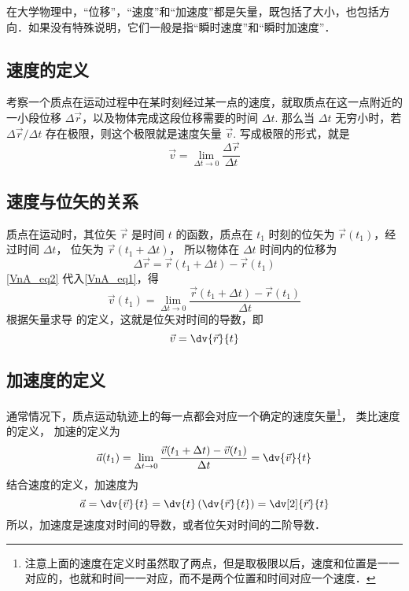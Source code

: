 

在大学物理中，“位移”，“速度”和“加速度”都是矢量，既包括了大小，也包括方向．如果没有特殊说明，它们一般是指“瞬时速度”和“瞬时加速度”．

\subsection{速度的定义}
考察一个质点在运动过程中在某时刻经过某一点的速度，就取质点在这一点附近的一小段位移 $\Delta\vec r$，以及物体完成这段位移需要的时间 $\Delta t$. 那么当 $\Delta t$ 无穷小时，若 $\Delta \vec r/\Delta t$ 存在极限，则这个极限就是速度矢量 $\vec v$. 写成极限的形式，就是
\begin{equation}\label{VnA_eq1}
\vec v = \lim_{\Delta t \to 0} \frac{{\Delta \vec r}}{{\Delta t}}
\end{equation}

\subsection{速度与位矢的关系}

质点在运动时，其位矢 $\vec r$ 是时间 $t$ 的函数，质点在 ${t_1}$ 时刻的位矢为 $\vec r(t_1)$，经过时间 $\Delta t$， 位矢为 $\vec r(t_1 + \Delta t)$， 所以物体在 $\Delta t$ 时间内的位移为
\begin{equation}\label{VnA_eq2}
\Delta \vec r = \vec r (t_1 + \Delta t) - \vec r (t_1)
\end{equation}
\autoref{VnA_eq2} 代入\autoref{VnA_eq1}，得
\begin{equation}\label{VnA_eq3}
\vec v(t_1) = \lim_{\Delta t \to 0} \frac{{\vec r (t_1 + \Delta t) - \vec r(t_1)}}{{\Delta t}}
\end{equation}
根据矢量求导 的定义，这就是位矢对时间的导数，即
\begin{equation}
\vec v = \dv{\vec r}{t}
\end{equation}


\subsection{加速度的定义}

通常情况下，质点运动轨迹上的每一点都会对应一个确定的速度矢量\footnote{注意上面的速度在定义时虽然取了两点，但是取极限以后，速度和位置是一一对应的，也就和时间一一对应，而不是两个位置和时间对应一个速度．}， 类比速度的定义， 加速的定义为
\begin{equation}
\vec a(t_1) = \lim_{\Delta t \to 0} \frac{{\vec v(t_1 + \Delta t) - \vec v (t_1)}}{{\Delta t}} = \dv{\vec v}{t}
\end{equation}
结合速度的定义，加速度为
\begin{equation}
\vec a = \dv{\vec v}{t} = \dv{t} \left( \dv{\vec r}{t} \right) = \dv[2]{\vec r}{t}
\end{equation}
所以，加速度是速度对时间的导数，或者位矢对时间的二阶导数．

